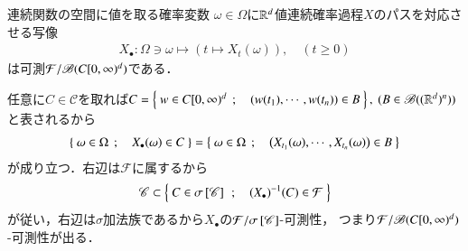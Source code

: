\begin{comment}
	\item[時点に重複がある場合]
		$(r_{k_1},\cdots,r_{k_l}) \subset (t_1,\cdots,t_{n_1})$が重複時点であるとき，$A_1,A_2$の同値な表記は次のようにすればよい：
		\begin{align}
			A_1 &= \left\{\ w \in C[0,\infty)^d\quad |\quad (w(t_1),.,w(r_{k_1}),.,w(r_{k_l}),.,w(t_{n_1}),\mbox{\scriptsize($s_1, \cdots, s_{n_2}$から$r_{k_1},\cdots,r_{k_l}$を抜いたものを並べる)}) \in C_1 \times (\R^d)^{n_2 - l}\ \right\} \\
			A_2 &= \left\{\ w \in C[0,\infty)^d\quad |\quad (w(s_1),.,w(r_{k_1}),.,w(r_{k_l}),.,w(s_{n_2}),\mbox{\scriptsize($t_1, \cdots, t_{n_1}$から$r_{k_1},\cdots,r_{k_l}$を抜いたものを並べる)}) \in C_2 \times (\R^d)^{n_1 - l}\ \right\}
		\end{align}
		$A_2$について，条件中の時点の並びを変換し$A_1$の条件の順番に合わせる行列$J_2$(連続,線型,全単射)を用いて
		\begin{align}
			A_2 = \left\{\ w \in C[0,\infty)^d\quad |\quad (w(t_1),.,w(r_{k_1}),.,w(r_{k_l}),.,w(t_{n_1}),\mbox{\scriptsize($s_1, \cdots, s_{n_2}$から$r_{k_1},\cdots,r_{k_l}$を抜いたものを並べる)}) \in J_2(C_2 \times (\R^d)^{n_1 - l})\ \right\}
		\end{align}
		と書き直せば，$A_1 \cap A_2$は前段の様に表現可能であり，前段と同様に最後に時点を昇順に変換する行列を用いることで$A_1 \cap A_2 \in \mathscr{C}$となることが明確に判る．
	\end{description}
	\QED
\end{prf}
\end{comment}

\begin{itembox}[l]{連続関数の空間に値を取る確率変数}
	$\omega \in \Omega$に$\mathbb{R}^d$値連続確率過程$X$のパスを対応させる写像
	\begin{align}
		X_{\bullet} : \Omega \ni \omega \longmapsto (t \longmapsto X_t(\omega)), \quad (t \geq 0)
	\end{align}
	は可測$\mathcal{F}/\mathscr{B}(C[0,\infty)^d)$である．
\end{itembox}
\begin{prf}
	任意に$C \in \mathscr{C}$を取れば$C = \left\{\ w \in C[0,\infty)^d\ \, ; \quad (w(t_1),\cdots,w(t_n)) \in B\ \right\}, \ (B \in \mathscr{B}((\mathbb{R}^d)^n))$
	と表されるから
	\begin{align}
		\left\{\ \omega \in \Omega\ \, ; \quad X_{\bullet}(\omega) \in C\ \right\}
		= \left\{\ \omega \in \Omega\ \, ; \quad \left(X_{t_1}(\omega), \cdots, X_{t_n}(\omega)\right) \in B\ \right\}
	\end{align}
	が成り立つ．右辺は$\mathcal{F}$に属するから
	\begin{align}
		\mathscr{C} \subset \left\{\ C \in \sigma \left[\mathscr{C}\right]\ \, ; \quad (X_{\bullet})^{-1}(C) \in \mathcal{F}\ \right\}
	\end{align}
	が従い，右辺は$\sigma$加法族であるから$X_{\bullet}$の$\mathcal{F}/\sigma \left[\mathscr{C}\right]$-可測性，
	つまり$\mathcal{F}/\mathscr{B}(C[0,\infty)^d)$-可測性が出る．
	\QED
\end{prf}
